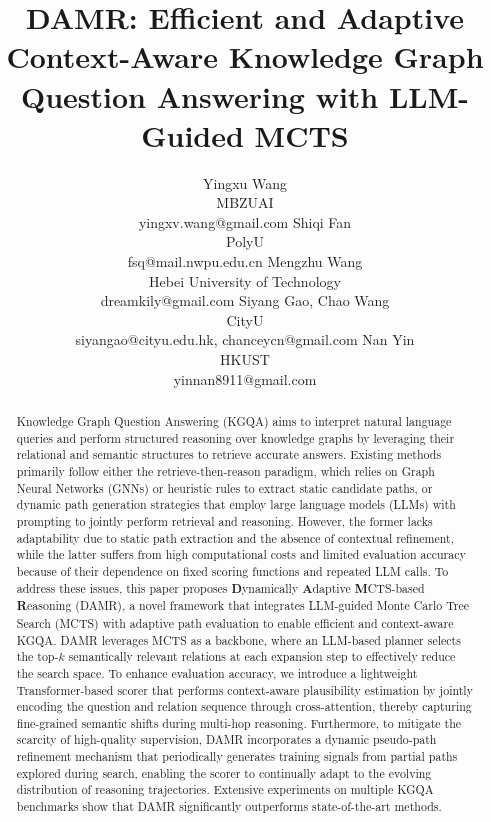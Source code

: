 \documentclass{article} %
\title{DAMR: Efficient and Adaptive Context-Aware Knowledge Graph Question Answering with LLM-Guided MCTS}
\author{%
  Yingxu Wang\\
  MBZUAI \\
  yingxv.wang@gmail.com
  \And
  Shiqi Fan\\
  PolyU\\
  fsq@mail.nwpu.edu.cn
  \And
  Mengzhu Wang\\
  Hebei University of Technology\\
  dreamkily@gmail.com
  \And
  Siyang Gao, Chao Wang\\
  CityU\\
  {siyangao@cityu.edu.hk, chanceycn@gmail.com}
  \And
  Nan Yin \\
  HKUST \\
  yinnan8911@gmail.com
}
\newcommand{\method}{DAMR}
\begin{document}
\maketitle
\begin{abstract}
Knowledge Graph Question Answering (KGQA) aims to interpret natural language queries and perform structured reasoning over knowledge graphs by leveraging their relational and semantic structures to retrieve accurate answers. 
Existing methods primarily follow either the retrieve-then-reason paradigm, which relies on Graph Neural Networks (GNNs) or heuristic rules to extract static candidate paths, or dynamic path generation strategies that employ large language models (LLMs) with prompting to jointly perform retrieval and reasoning. 
However, the former lacks adaptability due to static path extraction and the absence of contextual refinement, while the latter suffers from high computational costs and limited evaluation accuracy because of their dependence on fixed scoring functions and repeated LLM calls.
To address these issues, this paper proposes \textbf{D}ynamically \textbf{A}daptive \textbf{M}CTS-based \textbf{R}easoning (\method{}), a novel framework that integrates LLM-guided Monte Carlo Tree Search (MCTS) with adaptive path evaluation to enable efficient and context-aware KGQA. 
\method{} leverages MCTS as a backbone, where an LLM-based planner selects the top-$k$ semantically relevant relations at each expansion step to effectively reduce the search space. To enhance evaluation accuracy, we introduce a lightweight Transformer-based scorer that performs context-aware plausibility estimation by jointly encoding the question and relation sequence through cross-attention, thereby capturing fine-grained semantic shifts during multi-hop reasoning. Furthermore, to mitigate the scarcity of high-quality supervision, \method{} incorporates a dynamic pseudo-path refinement mechanism that periodically generates training signals from partial paths explored during search, enabling the scorer to continually adapt to the evolving distribution of reasoning trajectories.
Extensive experiments on multiple KGQA benchmarks show that \method{} significantly outperforms state-of-the-art methods. 
\end{abstract}




% 








\end{document}
